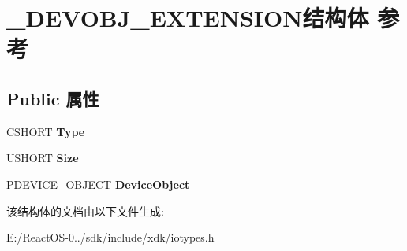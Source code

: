 \hypertarget{struct___d_e_v_o_b_j___e_x_t_e_n_s_i_o_n}{}\section{\+\_\+\+D\+E\+V\+O\+B\+J\+\_\+\+E\+X\+T\+E\+N\+S\+I\+O\+N结构体 参考}
\label{struct___d_e_v_o_b_j___e_x_t_e_n_s_i_o_n}
\subsection*{Public 属性}
\begin{DoxyCompactItemize}
\item 
\mbox{\label{struct___d_e_v_o_b_j___e_x_t_e_n_s_i_o_n_a5747c5322f65746a15a42968d49ab85e}} 
C\+S\+H\+O\+RT {\bfseries Type}
\item 
\mbox{\label{struct___d_e_v_o_b_j___e_x_t_e_n_s_i_o_n_a0f11b861f7568f4902749c9b31beb823}} 
U\+S\+H\+O\+RT {\bfseries Size}
\item 
\mbox{\label{struct___d_e_v_o_b_j___e_x_t_e_n_s_i_o_n_a3b003b96f1dc01c06d16b439b4eefff0}} 
\hyperlink{struct___d_e_v_i_c_e___o_b_j_e_c_t}{P\+D\+E\+V\+I\+C\+E\+\_\+\+O\+B\+J\+E\+CT} {\bfseries Device\+Object}
\end{DoxyCompactItemize}


该结构体的文档由以下文件生成\+:\begin{DoxyCompactItemize}
\item 
E\+:/\+React\+O\+S-\/0../sdk/include/xdk/iotypes.\+h\end{DoxyCompactItemize}
